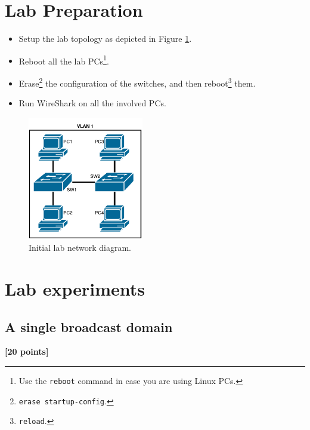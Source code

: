 \documentclass[pdftex,12pt,a4paper]{article}
\begin{document}
    \section{Lab Preparation}
        \begin{itemize}
            \item Setup the lab topology as depicted in Figure
                \ref{fig:netdiag}.
            \item Reboot all the lab PCs\footnote{Use the \texttt{reboot}
                command in case you are using Linux PCs.}.
            \item Erase\footnote{\texttt{erase
                startup-config}.} the configuration of the switches, and then
                reboot\footnote{\texttt{reload}.} them.
            \item Run WireShark on all the involved PCs.
        \end{itemize}

        \begin{figure}[tbh]
            \centering
            \includegraphics[width=0.45\textwidth]{figures/netdiag}
            \caption{Initial lab network diagram.}
            \label{fig:netdiag}
        \end{figure}

    \section{Lab experiments}
        \subsection{A single broadcast domain}
            \begin{flushright}
                \textbf{[20 points]}
            \end{flushright}
\end{document}
